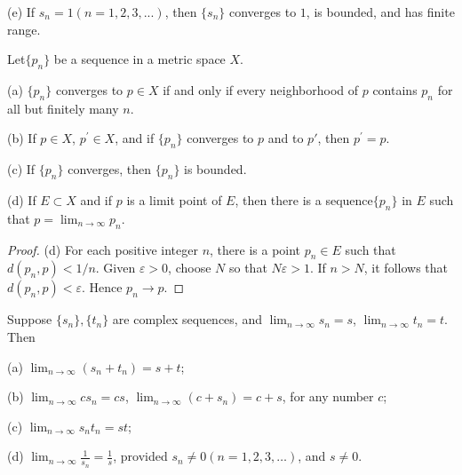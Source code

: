 (e) If $s_n = 1(n=1,2,3,...)$, then $\{s_n\}$ converges to $1$, is bounded, and has finite range.


\begin{thm}\label{thm:3.2 convergence sequence in metric space}
    Let$\{p_n\}$ be a sequence in a metric space $X$.

(a) $\{p_n\}$ converges to $p \in X$ if and only if every neighborhood of $p$ contains $p_n$ for all but finitely many $n$.

(b) If $p\in X$, $p^\prime \in X$, and if $\{p_n\}$ converges to $p$ and to $p'$, then $p^\prime =p$.

(c) If $\{p_n\}$ converges, then $\{p_n\}$ is bounded.

(d) If $E \subset X$ and if $p$ is a limit point of $E$, then there is a sequence$\{p_n\}$ in $E$ such that $p = \lim_{n \to \infty} p_n$.

\end{thm}

\begin{proof}
    (d) For each positive integer $n$, there is a point $p_n \in E$ such that $d(p_n,p) <1/n$. Given $\varepsilon > 0$, choose $N$ so that $N \varepsilon >1$. If $n>N$, it follows that $d(p_n, p) <\varepsilon$. Hence $p_n \rightarrow p$.
\end{proof}

\begin{thm}\label{thm:3.3}
    Suppose $\{s_n\}, \{t_n\}$ are complex sequences, and 
    $\lim_{n \to \infty} s_n = s$,
    $\lim_{n \to \infty} t_n = t$.
    Then

    (a) $\lim_{n \to \infty} (s_n + t_n) = s + t$;

    (b) $\lim_{n \to \infty} c s_n = cs$,
        $\lim_{n \to \infty} (c + s_n) = c + s$,
        for any number $c$;
    
    (c) $\lim_{n \to \infty} s_n t_n = st$;

    (d) $\lim_{n \to \infty} \frac{1}{s_n} = \frac{1}{s}$, provided $s_n \neq 0(n = 1,2,3,\dots)$, and $s \neq 0$.
\end{thm}

